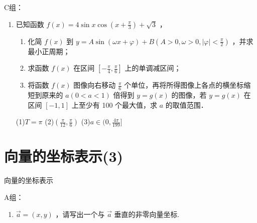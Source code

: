     
C组：
\begin{enumerate}
    \item 已知函数 $f(x)=4 \sin x \cos \left(x+\frac{\pi}{3}\right)+\sqrt{3}$ ，
    \begin{enumerate}
        \item 化简 $f(x)$ 到 $y=A \sin (\omega x+\varphi)+B\left(A>0, \omega>0,|\varphi|<\frac{\pi}{2}\right)$ ，并求最小正周期；
        \item 求函数 $f(x)$ 在区间 $\left[-\frac{\pi}{4}, \frac{\pi}{6}\right]$ 上的单调减区间；
        \item 将函数 $f(x)$ 图像向右移动 $\frac{\pi}{6}$ 个单位，再将所得图像上各点的横坐标缩短到原来的 $a(0<a<1)$ 倍得到 $y=g(x)$ 的图像，若 $y=g(x)$ 在区间 $[-1,1]$ 上至少有 100 个最大值，求 $a$ 的取值范围．
    \end{enumerate}
\begin{jieda}
    (1)$T=\pi$
    (2)$(\frac{\pi}{12},\frac{\pi}{6})$
    (3)$a\in(0,\frac{4\pi}{199}]$
\end{jieda}

\end{enumerate}

\section*{向量的坐标表示(3)}
\zsd 向量的坐标表示

A组：
\begin{enumerate}
    \item $\vec{a}=(x, y)$ ，请写出一个与 $\vec{a}$ 垂直的非零向量坐标.
\end{enumerate}

